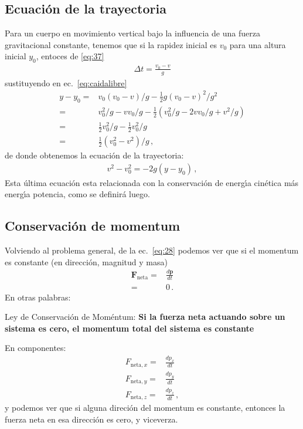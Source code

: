 \subsection{Ecuación de la trayectoria}
Para un cuerpo en movimiento vertical bajo la influencia de una fuerza gravitacional constante, tenemos que si la rapidez inicial es $v_0$ para una altura inicial $y_0$, entoces de \eqref{eq:37}
\begin{align}
  \Delta t=\frac{v_0-v}{g}
\end{align}
sustituyendo en ec.~\eqref{eq:caidalibre}
\begin{align}
  y-y_0=&v_0(v_0-v)/g-\tfrac{1}{2}g(v_0-v)^2/g^2\nonumber\\
       =&v_0^2/g-vv_0/g-\tfrac{1}{2}(v_0^2/g-2vv_0/g+v^2/g)\nonumber\\
       =&\tfrac{1}{2}v_0^2/g-\tfrac{1}{2}v_0^2/g\nonumber\\
       =&\tfrac{1}{2}(v_0^2-v^2)/g\,,
\end{align}
de donde obtenemos la ecuación de la trayectoria:
\begin{align}
  \label{eq:trayectoriay}
  v^2-v_0^2=-2g(y-y_0)\,,
\end{align}
Esta \'ultima ecuaci\'on esta relacionada con la conservaci\'on de energ\'\i a cin\'etica m\'as energ\'\i a potencia, como se definir\'a luego.


\subsection{Conservación de momentum}
Volviendo al problema general, de la ec.~\eqref{eq:28} podemos ver que si el momentum es constante (en dirección, magnitud y masa)
\begin{align}
  \mathbf{F}_{\text{neta}}=&\frac{d\mathbf{p}}{dt}\nonumber\\
=&0\,.
\end{align}
En otras palabras:
\begin{frame}
  \begin{block}%
{Ley de Conservación de Moméntum:} \textbf{Si la fuerza neta actuando sobre un sistema es cero, el momentum total del sistema es constante}
  \end{block}
\end{frame}

En componentes:
\begin{align}
  F_{\text{neta},x}=&\frac{d p_x}{dt}\nonumber\\
  F_{\text{neta},y}=&\frac{d p_y}{dt}\nonumber\\
  F_{\text{neta},z}=&\frac{d p_z}{dt}\,,
\end{align}
y podemos ver que si alguna direción del momentum es constante, entonces la fuerza neta en esa dirección es cero, y viceverza.

